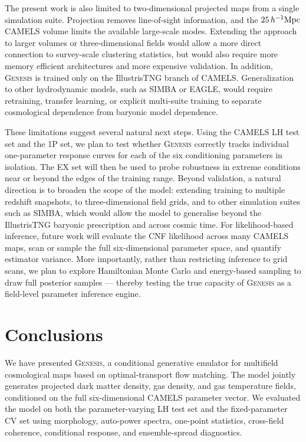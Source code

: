 \documentclass[usenatbib]{mnras}
\begin{document}
The present work is also limited to two-dimensional projected maps
from a single simulation suite. Projection removes line-of-sight
information, and the $25\,h^{-1}{\rm Mpc}$ CAMELS volume limits the
available large-scale modes. Extending the approach to larger volumes
or three-dimensional fields would allow a more direct connection to
survey-scale clustering statistics, but would also require more memory
efficient architectures and more expensive validation. In addition,
\textsc{Genesis} is trained only on the IllustrisTNG branch of CAMELS.
Generalization to other hydrodynamic models, such as SIMBA or EAGLE,
would require retraining, transfer learning, or explicit multi-suite
training to separate cosmological dependence from baryonic model
dependence.

These limitations suggest several natural next steps. Using the CAMELS
LH test set and the 1P set, we plan to test whether \textsc{Genesis}
correctly tracks individual one-parameter response curves for each of
the six conditioning parameters in isolation. The EX set will then be
used to probe robustness in extreme conditions near or beyond the
edges of the training range. Beyond validation, a natural direction is
to broaden the scope of the model: extending training to multiple
redshift snapshots, to three-dimensional field grids, and to other
simulation suites such as SIMBA, which would allow the model to
generalise beyond the IllustrisTNG baryonic prescription and across
cosmic time. For likelihood-based inference, future work will evaluate
the CNF likelihood across many CAMELS maps, scan or sample the full
six-dimensional parameter space, and quantify estimator variance.
More importantly, rather than restricting inference to grid scans, we
plan to explore Hamiltonian Monte Carlo and energy-based sampling
to draw full posterior samples --- thereby testing the true capacity
of \textsc{Genesis} as a field-level parameter inference engine.

\section{Conclusions}
\label{sec:conclusions}

We have presented \textsc{Genesis}, a conditional generative emulator
for multifield cosmological maps based on optimal-transport flow
matching. The model jointly generates projected dark matter density,
gas density, and gas temperature fields, conditioned on the full
six-dimensional CAMELS parameter vector. We evaluated the model on
both the parameter-varying LH test set and the fixed-parameter CV set
using morphology, auto-power spectra, one-point statistics,
cross-field coherence, conditional response, and ensemble-spread
diagnostics.
\end{document}
